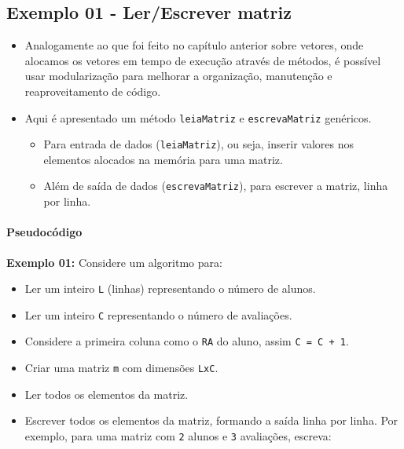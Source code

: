\documentclass[12pt,a4paper]{article}
\providecommand{\tightlist}{%
      \setlength{\itemsep}{0pt}\setlength{\parskip}{0pt}}
\begin{document}
    \hypertarget{exemplo-01---lerescrever-matriz}{%
\subsection{Exemplo 01 - Ler/Escrever
matriz}\label{exemplo-01---lerescrever-matriz}}

    \begin{itemize}
\item
  Analogamente ao que foi feito no capítulo anterior sobre vetores, onde
  alocamos os vetores em tempo de execução através de métodos, é
  possível usar modularização para melhorar a organização, manutenção e
  reaproveitamento de código.
\item
  Aqui é apresentado um método \texttt{leiaMatriz} e
  \texttt{escrevaMatriz} genéricos.

  \begin{itemize}
  \item
    Para entrada de dados (\texttt{leiaMatriz}), ou seja, inserir
    valores nos elementos alocados na memória para uma matriz.
  \item
    Além de saída de dados (\texttt{escrevaMatriz}), para escrever a
    matriz, linha por linha.
  \end{itemize}
\end{itemize}

    \hypertarget{pseudocuxf3digo}{%
\paragraph{Pseudocódigo}\label{pseudocuxf3digo}}

    \textbf{Exemplo 01:} Considere um algoritmo para:

\begin{itemize}
\tightlist
\item
  Ler um inteiro \texttt{L} (linhas) representando o número de alunos.
\item
  Ler um inteiro \texttt{C} representando o número de avaliações.
\item
  Considere a primeira coluna como o \texttt{RA} do aluno, assim
  \texttt{C\ =\ C\ +\ 1}.
\item
  Criar uma matriz \texttt{m} com dimensões \texttt{LxC}.
\item
  Ler todos os elementos da matriz.
\item
  Escrever todos os elementos da matriz, formando a saída linha por
  linha. Por exemplo, para uma matriz com \texttt{2} alunos e \texttt{3}
  avaliações, escreva:
\end{itemize}
\end{document}
